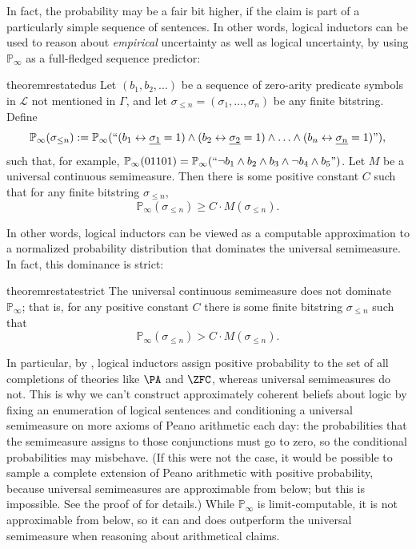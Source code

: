 \documentclass[authordate,onecolumn,noenvironments]{miri-tech-article}
\numberwithin{equation}{subsection}
\renewcommand{\iff}{\leftrightarrow}
\newcommand{\quot}[1]{``#1"}
\newcommand{\enc}[1]{{\underline{#1}}}
\newcommand{\nn}{n}
\newcommand{\rparenthetical}[1]{\hfill\upshape{{\small (#1)}}} %
\newcommand{\proofin}[1]{\rparenthetical{Proof in:~#1.}}
\newcommand{\BelState}{\mathbb{P}}
\newcommand{\pt}{\BelState}
\newcommand{\Theory}{\Gamma}
\newcommand{\Lang}{\mathcal{L}}
\begin{document}
In fact, the probability may be a fair bit higher, if the claim is part of a particularly simple sequence of sentences. In other words, logical inductors can be used to reason about \emph{empirical} uncertainty as well as logical uncertainty, by using $\pt_\infty$ as a full-fledged sequence predictor:

\begin{restatable}{theorem}{restatedus}\label{thm:dus}
  Let $(b_1, b_2, \ldots)$ be a sequence of zero-arity predicate symbols in $\Lang$ not mentioned in $\Theory$, and let $\sigma_{\le n}=(\sigma_1,\ldots,\sigma_\nn)$ be any finite bitstring. Define
  \[
    \pt_\infty(\sigma_{\le n}) := \pt_\infty(\quot{(b_1 \iff \enc{\sigma_1}=1) \land (b_2 \iff \enc{\sigma_2}=1) \land \ldots \land (b_n \iff \enc{\sigma_n}=1)}),
  \]
  such that, for example, $\pt_\infty(01101) = \pt_\infty(\quot{\lnot b_1 \land b_2 \land b_3 \land \lnot b_4 \land b_5})$.
  Let $M$ be a universal continuous semimeasure. Then there is some positive constant $C$ such that for any finite bitstring $\sigma_{\le n}$,
  \[
    \pt_\infty(\sigma_{\le n}) \ge C \cdot M(\sigma_{\le n}).
  \]
  \proofin{\ref{app:dus}}
\end{restatable}
\noindent In other words, logical inductors can be viewed as a computable approximation to a normalized probability distribution that dominates the universal semimeasure. In fact, this dominance is strict:

\begin{restatable}{theorem}{restatestrict}\label{thm:strict}
  The universal continuous semimeasure does not dominate $\pt_\infty$; that is, for any positive constant $C$ there is some finite bitstring $\sigma_{\le n}$ such that 
  \[
    \pt_\infty(\sigma_{\le n}) > C \cdot M(\sigma_{\le n}).
  \]
  \proofin{\ref{app:strict}}
\end{restatable}

\noindent In particular, by , logical inductors assign positive probability to the set of all completions of theories like $\PA$ and $\ZFC$, whereas universal semimeasures do not. This is why we can't construct approximately coherent beliefs about logic by fixing an enumeration of logical sentences and conditioning a universal semimeasure on more axioms of Peano arithmetic each day: the probabilities that the semimeasure assigns to those conjunctions must go to zero, so the conditional probabilities may misbehave. (If this were not the case, it would be possible to sample a complete extension of Peano arithmetic with positive probability, because universal semimeasures are approximable from below; but this is impossible. See the proof of  for details.) While $\pt_\infty$ is limit-computable, it is not approximable from below, so it can and does outperform the universal semimeasure when reasoning about arithmetical claims.
\end{document}
